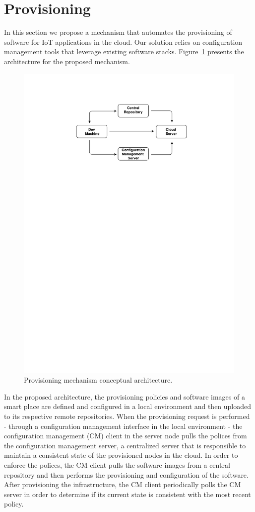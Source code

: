 \section{Provisioning}
\label{sec:provisioning}
In this section we propose a mechanism that automates the provisioning of software for \gls{IoT} applications
in the cloud. Our solution relies on configuration management tools that leverage existing software
stacks. Figure~\ref{fig:provisioning_generic_architecture} presents the architecture for the proposed
mechanism.\\

\begin{figure}[ht!]
  \centering
  \includegraphics[width=.7\textwidth]{images/c4t-generic-solution.pdf}
  \caption[Provisioning mechanism conceptual architecture.]{Provisioning mechanism conceptual architecture.}
  \label{fig:provisioning_generic_architecture}
\end{figure}

In the proposed architecture, the provisioning policies and software images of a smart place are
defined and configured in a local environment and then uploaded to its respective remote repositories.
When the provisioning request is performed - through a configuration management interface in the local
environment - the configuration management (CM) client in the server node pulls the polices from the
configuration management server, a centralized server that is responsible to maintain a consistent
state of the provisioned nodes in the cloud. In order to enforce the polices, the CM client pulls the
software images from a central repository and then performs the provisioning and configuration of
the software. After provisioning the infrastructure, the CM client periodically polls the CM server
in order to determine if its current state is consistent with the most recent policy.
